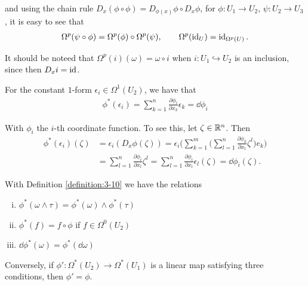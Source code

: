 and using the chain rule $D_x(\phi\circ\phi) = D_{\phi(x)}\phi\circ D_x\phi$, for $\phi:U_1\to U_2$, 
$\psi:U_2\to U_3$, it is easy to see that 
\begin{align*}
  \Omega^p(\psi\circ\phi) = \Omega^p(\phi)\circ\Omega^p(\psi),\qquad 
  \Omega^p(\operatorname{id}_U) = \operatorname{id}_{\Omega^p(U)}.
\end{align*}

It should be noteed that $\Omega^p(i)(\omega) = \omega\circ i$ when $i:U_1\hookrightarrow U_2$ is an inclusion, since 
then $D_xi = \operatorname{id}$.

\begin{example}\label{example:3-11}
  For the constant $1$-form $\epsilon_i\in\Omega^1(U_2)$, we have that
  \begin{align*}
    \phi^*(\epsilon_i) 
    = \sum_{k=1}^{n }{\frac{\partial \phi_i }{\partial x_k }\epsilon_k} 
    = \dd\phi_i
  \end{align*}
\end{example}

With $\phi_i$ the $i$-th coordinate function. To see this, let $\zeta\in{\ensuremath{\mathbb{R}}}^n$. Then 
\begin{align*}
  \phi^{*}(\epsilon_{i})(\zeta)
  & = \epsilon_{i}(D_{x}\phi(\zeta))
      = \epsilon_{i}\Bigg(\sum_{k=1}^{m}\Big(\sum_{l=1}^{n}\frac{\partial\phi_{k}}{\partial x_{l}}\zeta^{l}\Big)e_{k}\Bigg) \\
  & = \sum_{l=1}^{n}\frac{\partial\phi_{i}}{\partial x_{l}}\zeta^{l}
      =\sum_{l=1}^{n}\frac{\partial\phi_{i}}{\partial x_{l}}\epsilon_{l}(\zeta)=\dd\phi_{i}(\zeta).
\end{align*}

\begin{theorem}\label{theorem:3-12}
With Definition \ref{definition:3-10} we have the relations
\begin{enumerate}[(i)]
  \item $\phi^*(\omega\wedge\tau) = \phi^*(\omega)\wedge\phi^*(\tau)$
  \item $\phi^*(f) = f\circ\phi$ if $f\in\Omega^0(U_2)$
  \item $\dd\phi^*(\omega) = \phi^*(\!\dd\omega)$
\end{enumerate}

Conversely, if $\phi':\Omega^*(U_2)\to\Omega^*(U_1)$ is a linear map satisfying three conditions, then $\phi'=\phi$.
\end{theorem}

